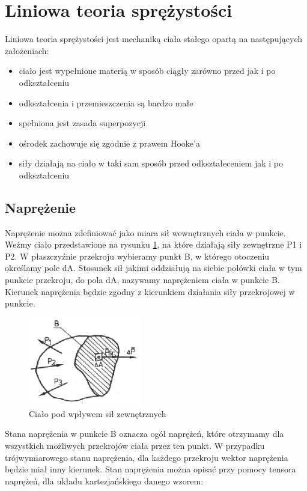 
\section{Liniowa teoria sprężystości}
\label{sec:liniowa_teoria_sprezystosci}

Liniowa teoria sprężystości jest mechaniką ciała stałego opartą na następujących założeniach:
\begin{itemize}
  \item ciało jest wypełnione materią w sposób ciągły zarówno przed jak i po odkształceniu
  \item odkształcenia i przemieszczenia są bardzo małe
  \item spełniona jest zasada superpozycji
  \item ośrodek zachowuje się zgodnie z prawem Hooke'a
  \item siły działają na ciało w taki sam sposób przed odkształeceniem jak i po odkształceniu
\end{itemize}

\subsection{Naprężenie}
\label{sec:naprezenie}

Naprężenie można zdefiniować jako miara sił wewnętrznych ciała w punkcie. Weźmy ciało przedstawione na rysunku \ref{fig:potato}, na które działają siły zewnętrzne P1 i P2. W płaszczyźnie przekroju wybieramy punkt B, w którego otoczeniu określamy pole dA. Stosunek sił jakimi oddziałują na siebie połówki ciała w tym punkcie przekroju, do pola dA, nazywamy naprężeniem ciała w punkcie B. Kierunek naprężenia będzie zgodny z kierunkiem działania siły przekrojowej w punkcie.

\begin{figure}[h]
\centering
\includegraphics[width=5cm]{Zdjecia/2/potato}
\caption{Ciało pod wpływem sił zewnętrznych \cite{bartek_wolny}}
\label{fig:potato}
\end{figure}

Stana naprężenia w punkcie B oznacza ogół naprężeń, które otrzymamy dla wszystkich możliwych przekrojów ciała przez ten punkt.
W przypadku trójwymiarowego stanu naprężenia, dla każdego przekroju wektor naprężenia będzie miał inny kierunek. Stan naprężenia można opisać przy pomocy tensora naprężeń, dla układu kartezjańskiego danego wzorem:


